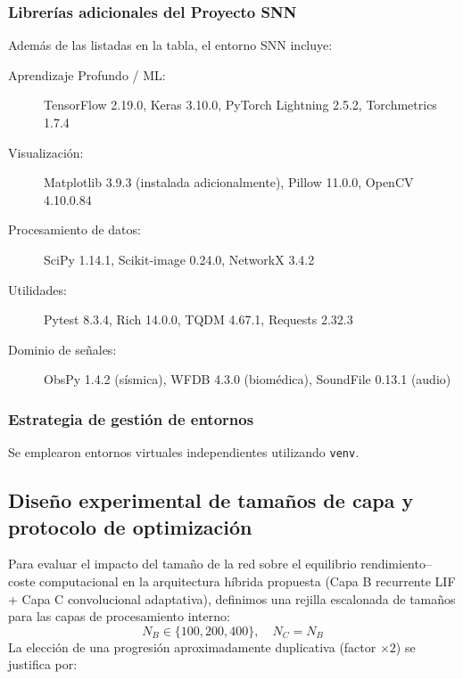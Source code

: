 \subsubsection*{Librerías adicionales del Proyecto SNN}
Además de las listadas en la tabla, el entorno SNN incluye:

\begin{description}
    \item[Aprendizaje Profundo / ML:] TensorFlow 2.19.0, Keras 3.10.0, PyTorch Lightning 2.5.2, Torchmetrics 1.7.4
    \item[Visualización:] Matplotlib 3.9.3 (instalada adicionalmente), Pillow 11.0.0, OpenCV 4.10.0.84
    \item[Procesamiento de datos:] SciPy 1.14.1, Scikit-image 0.24.0, NetworkX 3.4.2
    \item[Utilidades:] Pytest 8.3.4, Rich 14.0.0, TQDM 4.67.1, Requests 2.32.3
    \item[Dominio de señales:] ObsPy 1.4.2 (sísmica), WFDB 4.3.0 (biomédica), SoundFile 0.13.1 (audio)
\end{description}


\subsubsection*{Estrategia de gestión de entornos}
Se emplearon entornos virtuales independientes utilizando \texttt{venv}. 

\subsection{Diseño experimental de tamaños de capa y protocolo de optimización}
\label{subsec:diseno-experimental-neuronas}

Para evaluar el impacto del tamaño de la red sobre el equilibrio rendimiento--coste computacional en la arquitectura híbrida propuesta (Capa B recurrente LIF + Capa C convolucional adaptativa), definimos una rejilla escalonada de tamaños para las capas de procesamiento interno:
\[
N_B \in \{100, 200, 400\}, \quad N_C = N_B
\]
La elección de una progresión aproximadamente duplicativa (factor $\times 2$) se justifica por:

